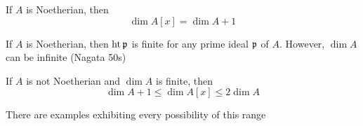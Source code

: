 \begin{theorem}
	If $A$ is Noetherian, then
	$$
		\dim A[x] = \dim A + 1
	$$
	
\end{theorem}

\begin{remark}
	If $A$ is Noetherian, then $\operatorname{ht} \mathfrak{p}$ is finite for any prime ideal $\mathfrak{p}$ of $A$. However, $\dim A$ can be infinite (Nagata 50s)
\end{remark}

\begin{remark}
	If $A$ is not Noetherian and $\dim A$ is finite, then
	$$
	\dim A + 1 \leq \dim A[x] \leq 2 \dim A
	$$
	
	There are examples exhibiting every possibility of this range
\end{remark}

